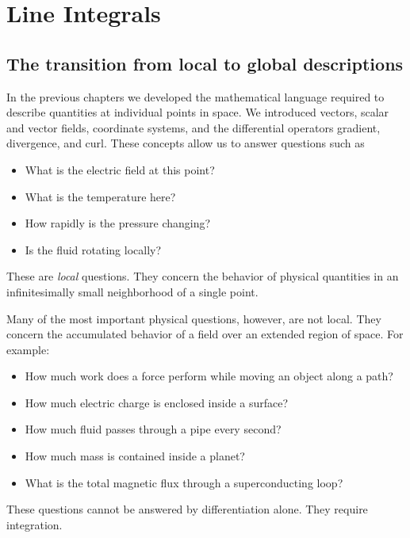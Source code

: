 \section{Line Integrals}
\label{sec:line-integrals}
\label{sec:local-to-global-physics}

\subsection{The transition from local to global descriptions}

In the previous chapters we developed the mathematical language required to
describe quantities at individual points in space. We introduced vectors,
scalar and vector fields, coordinate systems, and the differential operators
gradient, divergence, and curl. These concepts allow us to answer questions
such as

\begin{itemize}
  \item What is the electric field at this point?
  \item What is the temperature here?
  \item How rapidly is the pressure changing?
  \item Is the fluid rotating locally?
\end{itemize}

These are \emph{local} questions. They concern the behavior of physical
quantities in an infinitesimally small neighborhood of a single point.

Many of the most important physical questions, however, are not local. They
concern the accumulated behavior of a field over an extended region of space.
For example:

\begin{itemize}
  \item How much work does a force perform while moving an object along a path?
  \item How much electric charge is enclosed inside a surface?
  \item How much fluid passes through a pipe every second?
  \item How much mass is contained inside a planet?
  \item What is the total magnetic flux through a superconducting loop?
\end{itemize}

These questions cannot be answered by differentiation alone. They require
integration.

